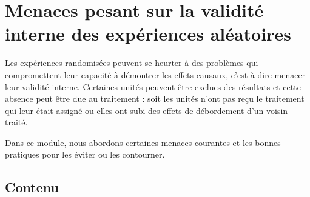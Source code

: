 \documentclass[
  12pt,
]{book}
\begin{document}
\hypertarget{menaces-pesant-sur-la-validituxe9-interne-des-expuxe9riences-aluxe9atoires}{%
\chapter{Menaces pesant sur la validité interne des expériences aléatoires}\label{menaces-pesant-sur-la-validituxe9-interne-des-expuxe9riences-aluxe9atoires}}

Les expériences randomisées peuvent se heurter à des problèmes qui compromettent leur capacité à démontrer les effets causaux, c'est-à-dire menacer leur validité interne.
Certaines unités peuvent être exclues des résultats et cette absence peut être due au traitement : soit les unités n'ont pas reçu le traitement qui leur était assigné ou elles ont subi des effets de débordement d'un voisin traité.

Dans ce module, nous abordons certaines menaces courantes et les bonnes pratiques pour les éviter ou les contourner.

\hypertarget{contenu-7}{%
\section{Contenu}\label{contenu-7}}
\end{document}
